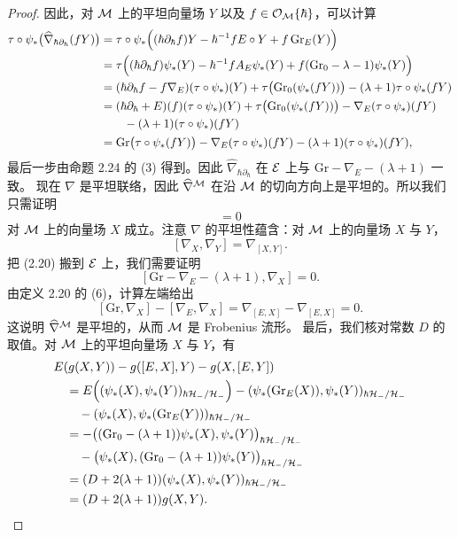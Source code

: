 \begin{proof}
因此，对 $\mathcal{M}$ 上的平坦向量场 $Y$ 以及 $f\in\mathcal{O}_{\mathcal{M}}\{\hbar\}$，可以计算
\begin{align*}
\tau\circ\psi_*\bigl(\widehat{\nabla}_{\hbar\partial_\hbar}(fY)\bigr)
&=\tau\circ\psi_*\Bigl((\hbar\partial_\hbar f)Y-\hbar^{-1}fE\circ Y+f\,\mathrm{Gr}_E(Y)\Bigr)\\
&=\tau\Bigl((\hbar\partial_\hbar f)\psi_*(Y)-\hbar^{-1}fA_E\psi_*(Y)+f(\mathrm{Gr}_0-\lambda-1)\psi_*(Y)\Bigr)\\
&=(\hbar\partial_\hbar f-f\nabla_E)(\tau\circ\psi_*)(Y)+\tau\bigl(\mathrm{Gr}_0(\psi_*(fY))\bigr)-(\lambda+1)\tau\circ\psi_*(fY)\\
&=(\hbar\partial_\hbar+E)(f)(\tau\circ\psi_*)(Y)+\tau\bigl(\mathrm{Gr}_0(\psi_*(fY))\bigr)-\nabla_E(\tau\circ\psi_*)(fY)\\
&\qquad-(\lambda+1)(\tau\circ\psi_*)(fY)\\
&=\mathrm{Gr}\bigl(\tau\circ\psi_*(fY)\bigr)-\nabla_E(\tau\circ\psi_*)(fY)-(\lambda+1)(\tau\circ\psi_*)(fY),
\end{align*}
最后一步由命题 2.24 的 (3) 得到。因此 $\widehat{\nabla}_{\hbar\partial_\hbar}$ 在 $\mathcal{E}$ 上与 $\mathrm{Gr}-\nabla_E-(\lambda+1)$ 一致。
现在 $\nabla$ 是平坦联络，因此 $\widehat{\nabla}^{\mathcal{M}}$ 在沿 $\mathcal{M}$ 的切向方向上是平坦的。所以我们只需证明
\begin{equation}
[\widehat{\nabla}^{\cM}_{\hbar\partial_\hbar},\widehat{\nabla}^{\cM}_X]=0 \tag{2.20}
\end{equation}
对 $\mathcal{M}$ 上的向量场 $X$ 成立。注意 $\nabla$ 的平坦性蕴含：对 $\mathcal{M}$ 上的向量场 $X$ 与 $Y$，
\[
[\nabla_X,\nabla_Y]=\nabla_{[X,Y]}.
\]
把 (2.20) 搬到 $\mathcal{E}$ 上，我们需要证明
\[
[\mathrm{Gr}-\nabla_E-(\lambda+1),\nabla_X]=0.
\]
由定义 2.20 的 (6)，计算左端给出
\[
[\mathrm{Gr},\nabla_X]-[\nabla_E,\nabla_X]=\nabla_{[E,X]}-\nabla_{[E,X]}=0.
\]
这说明 $\widehat{\nabla}^{\mathcal{M}}$ 是平坦的，从而 $\mathcal{M}$ 是 Frobenius 流形。
最后，我们核对常数 $D$ 的取值。对 $\mathcal{M}$ 上的平坦向量场 $X$ 与 $Y$，有
\begin{align*}
&E(g(X,Y))-g([E,X],Y)-g(X,[E,Y])\\
&\quad=E\Bigl((\psi_*(X),\psi_*(Y))_{\hbar\mathcal{H}_-/\mathcal{H}_-}\Bigr)-(\psi_*(\mathrm{Gr}_E(X)),\psi_*(Y))_{\hbar\mathcal{H}_-/\mathcal{H}_-}\\
&\qquad-(\psi_*(X),\psi_*(\mathrm{Gr}_E(Y)))_{\hbar\mathcal{H}_-/\mathcal{H}_-}\\
&\quad=-\bigl((\mathrm{Gr}_0-(\lambda+1))\psi_*(X),\psi_*(Y)\bigr)_{\hbar\mathcal{H}_-/\mathcal{H}_-}\\
&\qquad-\bigl(\psi_*(X),(\mathrm{Gr}_0-(\lambda+1))\psi_*(Y)\bigr)_{\hbar\mathcal{H}_-/\mathcal{H}_-}\\
&\quad=(D+2(\lambda+1))(\psi_*(X),\psi_*(Y))_{\hbar\mathcal{H}_-/\mathcal{H}_-}\\
&\quad=(D+2(\lambda+1))g(X,Y).
\end{align*}
\end{proof}

